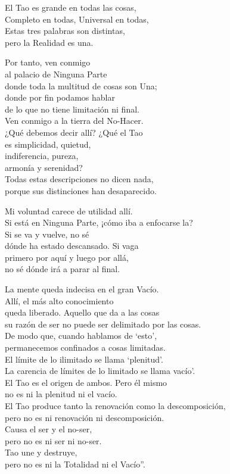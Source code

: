 \documentclass[hidelinks]{memoir}
\begin{document}
	El Tao es grande en todas las cosas,\\
	Completo en todas, Universal en todas,\\
	Estas tres palabras son distintas,\\
	pero la Realidad es una.
	
	Por tanto, ven conmigo\\
	al palacio de Ninguna Parte\\
	donde toda la multitud de cosas son Una;\\
	donde por fin podamos hablar\\
	de lo que no tiene limitación ni final.\\
	Ven conmigo a la tierra del No-Hacer.\\
	¿Qué debemos decir allí? ¿Qué el Tao\\
	es simplicidad, quietud,\\
	indiferencia, pureza,\\
	armonía y serenidad?\\
	Todas estas descripciones no dicen nada,\\
	porque sus distinciones han desaparecido.
	
	Mi voluntad carece de utilidad allí.\\
	Si está en Ninguna Parte, ¡cómo iba a enfocarse la?\\
	Si se va y vuelve, no sé\\
	dónde ha estado descansado. Si vaga\\
	primero por aquí y luego por allá,\\
	no sé dónde irá a parar al final.
	
	La mente queda indecisa en el gran Vacío.\\
	Allí, el más alto conocimiento\\
	queda liberado. Aquello que da a las cosas\\
	su razón de ser no puede ser delimitado por las cosas.\\
	De modo que, cuando hablamos de `esto',\\
	permanecemos confinados a cosas limitadas.\\
	El límite de lo ilimitado se llama `plenitud'.\\
	La carencia de límites de lo limitado se llama vacío'.\\
	El Tao es el origen de ambos. Pero él mismo\\
	no es ni la plenitud ni el vacío.\\
	El Tao produce tanto la renovación como la descomposición,\\
	pero no es ni renovación ni descomposición.\\
	Causa el ser y el no-ser,\\
	pero no es ni ser ni no-ser.\\
	Tao une y destruye,\\
	pero no es ni la Totalidad ni el Vacío''.
	
\end{document}
